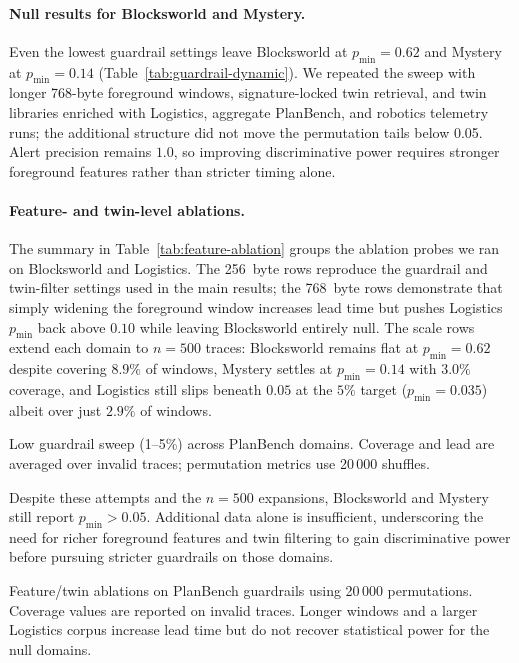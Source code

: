 \documentclass[11pt]{article}
\begin{document}
\paragraph{Null results for Blocksworld and Mystery.} Even the lowest guardrail
settings leave Blocksworld at $p_{\min}=0.62$ and Mystery at
$p_{\min}=0.14$ (Table~\ref{tab:guardrail-dynamic}). We repeated the sweep with
longer 768-byte foreground windows, signature-locked twin retrieval, and twin
libraries enriched with Logistics, aggregate PlanBench, and robotics telemetry
runs; the additional structure did not move the permutation tails below 0.05.
Alert precision remains $1.0$, so improving discriminative power requires
stronger foreground features rather than stricter timing alone.

\paragraph{Feature- and twin-level ablations.} The summary in
Table~\ref{tab:feature-ablation} groups the ablation probes we ran on
Blocksworld and Logistics. The 256~byte rows reproduce the guardrail and
twin-filter settings used in the main results; the 768~byte rows demonstrate
that simply widening the foreground window increases lead time but pushes Logistics
$p_{\min}$ back above $0.10$ while leaving Blocksworld entirely null. The scale
rows extend each domain to $n=500$ traces: Blocksworld remains flat at
$p_{\min}=0.62$ despite covering $8.9\%$ of windows, Mystery settles at
$p_{\min}=0.14$ with $3.0\%$ coverage, and Logistics still slips beneath $0.05$
at the $5\%$ target ($p_{\min}=0.035$) albeit over just $2.9\%$ of windows.

\begin{table}[t]
  \centering
  \caption{Low guardrail sweep (1--5\%) across PlanBench domains. Coverage and lead are averaged over invalid traces; permutation metrics use 20\,000 shuffles.}
  \label{tab:guardrail-dynamic}
  
\end{table}

Despite these attempts and the $n=500$ expansions, Blocksworld and Mystery still report $p_{\min} > 0.05$.
Additional data alone is insufficient, underscoring the need for richer
foreground features and twin filtering to gain discriminative power before
pursuing stricter guardrails on those domains.

\begin{table}[t]
  \centering
  \caption{Feature/twin ablations on PlanBench guardrails using 20\,000 permutations. Coverage values are reported on invalid traces. Longer windows and a larger Logistics corpus increase lead time but do not recover statistical power for the null domains.}
  \label{tab:feature-ablation}
  
\end{table}
\end{document}
